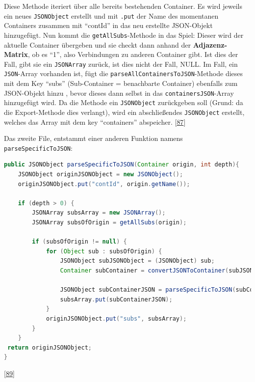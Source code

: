 \documentclass[
    headings=optiontotocandhead,%
    twoside,
    numbers=noenddot,%
    12pt, %
    titlepage, %
    parskip=full, %
    listof=leveldown, 
    numbers=noenddot, %
    a4paper,DIV=14,
    BCOR=15mm,
]{scrbook}
\newcommand{\passthrough}[1]{#1}
\begin{document}
Diese Methode iteriert über alle bereits bestehenden Container. Es wird
jeweils ein neues \passthrough{\lstinline!JSONObject!} erstellt und mit
\passthrough{\lstinline!.put!} der Name des momentanen Containers
zusammen mit ``contId'' in das neu erstellte JSON-Objekt hinzugefügt.
Nun kommt die \passthrough{\lstinline!getAllSubs!}-Methode in das Spiel:
Dieser wird der aktuelle Container übergeben und sie checkt dann anhand
der \textbf{Adjazenz-Matrix}, ob es ``1'', also Verbindungen zu anderen
Container gibt. Ist dies der Fall, gibt sie ein
\passthrough{\lstinline!JSONArray!} zurück, ist dies nicht der Fall,
NULL. Im Fall, ein \passthrough{\lstinline!JSON!}-Array vorhanden ist,
fügt die \passthrough{\lstinline!parseAllContainersToJSON!}-Methode
dieses mit dem Key ``subs'' (Sub-Container = benachbarte Container)
ebenfalls zum JSON-Objekt hinzu , bevor dieses dann selbst in das
\passthrough{\lstinline!containersJSON!}-Array hinzugefügt wird. Da die
Methode ein \passthrough{\lstinline!JSONObject!} zurückgeben soll
(Grund: da die Export-Methode dies verlangt), wird ein abschließendes
\passthrough{\lstinline!JSONObject!} erstellt, welches das Array mit dem
key ``containers'' abspeicher.
{[}\protect\hyperlink{ref-HowToDoInJava-JSON}{87}{]}

Das zweite File, entstammt einer anderen Funktion namens
\passthrough{\lstinline!parseSpecificToJSON!}:

\begin{lstlisting}[language=Java, caption={parseSpecificToJSON Methode}]
public JSONObject parseSpecificToJSON(Container origin, int depth){ 
    JSONObject originJSONObject = new JSONObject();
    originJSONObject.put("contId", origin.getName());
    
    if (depth > 0) {
        JSONArray subsArray = new JSONArray();
        JSONArray subsOfOrigin = getAllSubs(origin);
  
        if (subsOfOrigin != null) {
            for (Object sub : subsOfOrigin) {
                JSONObject subJSONObject = (JSONObject) sub;
                Container subContainer = convertJSONToContainer(subJSONObject);
  
                JSONObject subContainerJSON = parseSpecificToJSON(subContainer, depth -1);
                subsArray.put(subContainerJSON);
            }
            originJSONObject.put("subs", subsArray);
        }
    }
 return originJSONObject;
}
\end{lstlisting}

{[}\protect\hyperlink{ref-gpt-SpecificJson}{89}{]}
\end{document}
